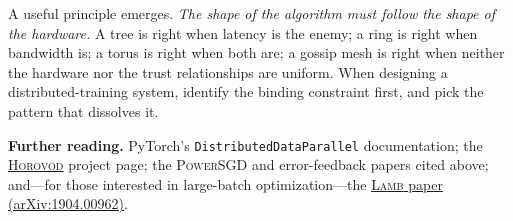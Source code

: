 \documentclass[11pt,a4paper]{article}
\theoremstyle{definition}
\theoremstyle{remark}
\theoremstyle{plain}
\begin{document}
\begin{center}
\end{center}

A useful principle emerges. \emph{The shape of the algorithm must follow
the shape of the hardware.} A tree is right when latency is the enemy; a
ring is right when bandwidth is; a torus is right when both are; a gossip
mesh is right when neither the hardware nor the trust relationships are
uniform. When designing a distributed-training system, identify the
binding constraint first, and pick the pattern that dissolves it.

\medskip
\noindent\textbf{Further reading.} PyTorch's
\texttt{DistributedDataParallel} documentation; the
\href{https://github.com/horovod/horovod}{\textsc{Horovod}} project page;
the \textsc{PowerSGD} and error-feedback papers cited above; and---for
those interested in large-batch optimization---the
\href{https://arxiv.org/abs/1904.00962}{\textsc{Lamb} paper
(arXiv:1904.00962)}.
\end{document}
